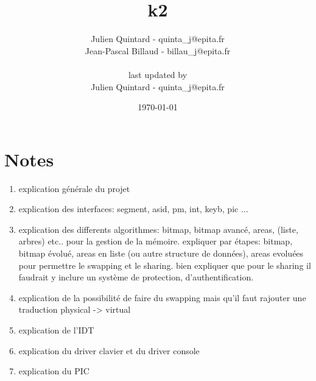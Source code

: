 \documentclass[10pt,a4wide]{article}
\title{k2}
\author{Julien Quintard - \small{quinta\_j@epita.fr} \\
        Jean-Pascal Billaud - \small{billau\_j@epita.fr} \\ \\
	\small{last updated by} \\
	Julien Quintard - \small{quinta\_j@epita.fr}}
\date{\today}
\begin{document}
\maketitle

\section{Notes}

\begin{enumerate}

\item explication g\'en\'erale du projet

\item explication des interfaces: segment, asid, pm, int, keyb, pic ...

\item explication des differents algorithmes: bitmap, bitmap avanc\'e,
      areas, (liste, arbres) etc.. pour la gestion de la m\'emoire. expliquer
      par \'etapes: bitmap, bitmap \'evolu\'e, areas en liste (ou autre
      structure de donn\'ees), areas evolu\'ees pour permettre le swapping
      et le sharing. bien expliquer que pour le sharing il faudrait y
      inclure un syst\`eme de protection, d'authentification.

\item explication de la possibilit\'e de faire du swapping mais qu'il
      faut rajouter une traduction physical -> virtual

\item explication de l'IDT

\item explication du driver clavier et du driver console

\item explication du PIC

\end{enumerate}
\end{document}
